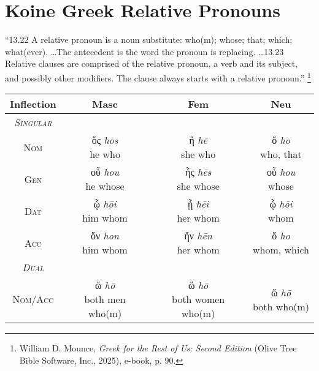 \documentclass[10pt]{memoir}
\newcommand{\tsc}[1]{\textsc{#1}}
\newcommand{\grc}[1]{\fontspec{Inter}#1}
\newcommand{\trc}[1]{\textit{\fontspec{Tinos}#1}}
\begin{document}
    \section*{Koine Greek Relative Pronouns}

    ``13.22 A relative pronoun is a noun substitute: who(m); whose; that; which; what(ever). \dots The antecedent is the word the pronoun is replacing. \dots 13.23 Relative clauses are comprised of the relative pronoun, a verb and its subject, and possibly other modifiers. The clause always starts with a relative pronoun.''
    \footnote{William D. Mounce, \emph{Greek for the Rest of Us: Second Edition} (Olive Tree Bible Software, Inc., 2025), e-book, p. 90.}

    \begin{table}[H]
        \begin{tabular}{c|ccc}
            \textbf{Inflection} & \textbf{Masc} & \textbf{Fem} & \textbf{Neu} \\
            \hline
            \emph{\tsc{Singular}} \\
            \tsc{Nom} & \makecell{\grc{ὅς} \trc{hos} \\ \small he who} & \makecell{\grc{ἥ} \trc{hē} \\ \small she who } & \makecell{\grc{ὅ} \trc{ho} \\ \small who, that} \\
            \tsc{Gen} & \makecell{\grc{οὗ} \trc{hou} \\ \small he whose} & \makecell{\grc{ἧς} \trc{hēs} \\ \small she whose} & \makecell{\grc{οὗ} \trc{hou} \\ \small whose} \\
            \tsc{Dat} & \makecell{\grc{ᾧ} \trc{hōi} \\ \small him whom } & \makecell{\grc{ᾗ} \trc{hēi} \\ \small her whom} & \makecell{\grc{ᾧ} \trc{hōi} \\ \small whom} \\
            \tsc{Acc} & \makecell{\grc{ὅν} \trc{hon} \\ \small him whom} & \makecell{\grc{ἥν} \trc{hēn} \\ \small her whom} & \makecell{\grc{ὅ} \trc{ho} \\ \small whom, which} \\
            \hline
            \emph{\tsc{Dual}} \\
            \tsc{Nom/Acc} & \makecell{\grc{ὥ} \trc{hō} \\ \small both men who(m)} & \makecell{\grc{ὥ} \trc{hō} \\ \small both women who(m)} & \makecell{\grc{ὥ} \trc{hō} \\ \small both who(m)} \\

\end{tabular}
\end{table}
\end{document}
